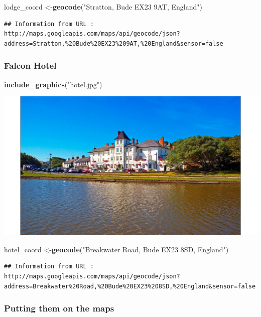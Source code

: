 \documentclass[]{article}
\newenvironment{Shaded}{\begin{snugshade}}{\end{snugshade}}
\newcommand{\KeywordTok}[1]{\textcolor[rgb]{0.13,0.29,0.53}{\textbf{#1}}}
\newcommand{\NormalTok}[1]{#1}
\newcommand{\StringTok}[1]{\textcolor[rgb]{0.31,0.60,0.02}{#1}}
\begin{document}
\begin{Shaded}
\begin{Highlighting}[]
\NormalTok{lodge_coord <-}\KeywordTok{geocode}\NormalTok{(}\StringTok{"Stratton, Bude EX23 9AT, England"}\NormalTok{)}
\end{Highlighting}
\end{Shaded}

\begin{verbatim}
## Information from URL : http://maps.googleapis.com/maps/api/geocode/json?address=Stratton,%20Bude%20EX23%209AT,%20England&sensor=false
\end{verbatim}

\hypertarget{falcon-hotel}{%
\subsubsection{Falcon Hotel}\label{falcon-hotel}}

\begin{Shaded}
\begin{Highlighting}[]
\KeywordTok{include_graphics}\NormalTok{(}\StringTok{"hotel.jpg"}\NormalTok{)}
\end{Highlighting}
\end{Shaded}

\includegraphics[width=0.25\linewidth]{hotel}

\begin{Shaded}
\begin{Highlighting}[]
\NormalTok{hotel_coord <-}\KeywordTok{geocode}\NormalTok{(}\StringTok{"Breakwater Road, Bude EX23 8SD, England"}\NormalTok{)}
\end{Highlighting}
\end{Shaded}

\begin{verbatim}
## Information from URL : http://maps.googleapis.com/maps/api/geocode/json?address=Breakwater%20Road,%20Bude%20EX23%208SD,%20England&sensor=false
\end{verbatim}

\hypertarget{putting-them-on-the-maps}{%
\subsubsection{Putting them on the
maps}\label{putting-them-on-the-maps}}
\end{document}
